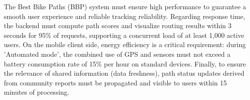 The Best Bike Paths (BBP) system must ensure high performance to guarantee a smooth user experience and reliable tracking reliability. Regarding response time, the backend must compute path scores and visualize routing results within 3 seconds for 95\% of requests, supporting a concurrent load of at least 1,000 active users. On the mobile client side, energy efficiency is a critical requirement: during 'Automated mode', the combined use of GPS and sensors must not exceed a battery consumption rate of 15\% per hour on standard devices. Finally, to ensure the relevance of shared information (data freshness), path status updates derived from community reports must be propagated and visible to users within 15 minutes of processing.